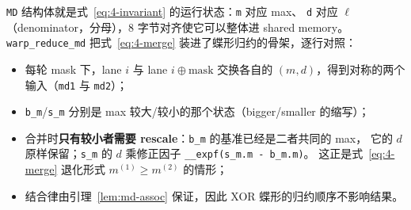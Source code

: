 \texttt{MD} 结构体就是式~\ref{eq:4-invariant} 的运行状态：\texttt{m} 对应 max、
\texttt{d} 对应 $\ell$（denominator，分母），8 字节对齐使它可以整体进 shared memory。
\texttt{warp\_\allowbreak{}reduce\_\allowbreak{}md} 把式~\ref{eq:4-merge} 装进了蝶形归约的骨架，逐行对照：
\begin{itemize}
  \item 每轮 mask 下，lane $i$ 与 lane $i \oplus \text{mask}$ 交换各自的
        $(m, d)$，得到对称的两个输入（\texttt{md1} 与 \texttt{md2}）；
  \item \texttt{b\_m}/\texttt{s\_m} 分别是 max 较大/较小的那个状态（bigger/smaller 的缩写）；
  \item 合并时\textbf{只有较小者需要 rescale}：\texttt{b\_m} 的基准已经是二者共同的 max，
        它的 $d$ 原样保留；\texttt{s\_m} 的 $d$ 乘修正因子
        \texttt{\_\allowbreak{}\_\allowbreak{}expf\allowbreak{}(s\_\allowbreak{}m.\allowbreak{}m - b\_\allowbreak{}m.\allowbreak{}m)}。
        这正是式~\ref{eq:4-merge} 退化形式 $m^{(1)} \ge m^{(2)}$ 的情形；
  \item 结合律由引理~\ref{lem:md-assoc} 保证，因此 XOR 蝶形的归约顺序不影响结果。
\end{itemize}


